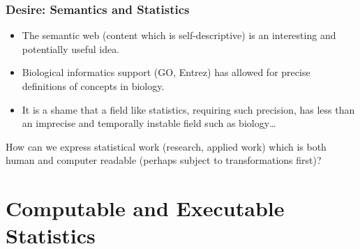 \documentclass{beamer}
\begin{document}
\begin{frame}
  \frametitle{Desire: Semantics and Statistics}
  \begin{itemize}
  \item The semantic web (content which is self-descriptive) is an
    interesting and potentially useful idea.
    
  \item 
    Biological informatics support (GO, Entrez) has allowed for
    precise definitions of concepts in biology.

  \item It is a shame that a field like statistics, requiring such
    precision, has less than an imprecise and temporally instable
    field such as biology\ldots
  \end{itemize}

  How can we express statistical work (research, applied work) which
  is both human and computer readable (perhaps subject to
  transformations first)?
\end{frame}




\section{Computable and Executable Statistics}
\end{document}
